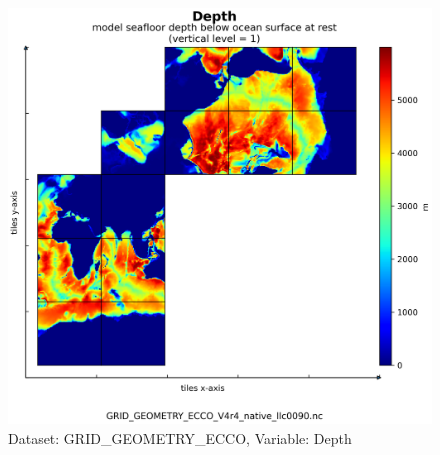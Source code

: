 \begin{figure}[H]
\centering
\includegraphics[scale=0.55]{../images/plots/native_plots_coords/Geometry_Parameters_for_the_Lat-Lon-Cap_90_(llc90)_Native_Model_Grid_(Version_4_Release_4)/Depth.png}
\caption{Dataset: GRID\_GEOMETRY\_ECCO, Variable: Depth}
\label{tab:table-GRID_GEOMETRY_ECCO_Depth-Plot}
\end{figure}
\newpage
\pagebreak
